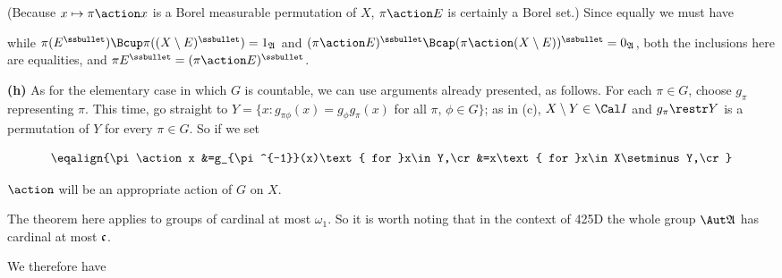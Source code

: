 {\noindent(Because $x\mapsto\pi\action x$ is a Borel measurable
permutation of $X$, $\pi\action E$ is certainly a Borel set.)
Since equally we must have


\noindent while
$\pi(E^{\ssbullet})\Bcup\pi((X\setminus E)^{\ssbullet})=1_{\frak A}$ and
$(\pi\action E)^{\ssbullet}
  \Bcap(\pi\action(X\setminus E))^{\ssbullet}=0_{\frak A}$,
both the inclusions here are equalities, and
$\pi E^{\ssbullet}=(\pi\action E)^{\ssbullet}$.\ \Qed

\medskip

{\bf (h)} As for the elementary case in which $G$ is countable, we can use
arguments already presented, as follows.   For each $\pi\in G$,
choose $g_{\pi}$ representing $\pi$.   This time, go
straight to
$Y=\{x:g_{\pi\phi}(x)=g_{\phi}g_{\pi}(x)$ for all $\pi$, $\phi\in G\}$;
as in (c), $X\setminus Y\in\Cal I$ and
$g_{\pi}\restr Y$ is a permutation of $Y$ for every $\pi\in G$.
So if we set

$$\eqalign{\pi\action x
&=g_{\pi^{-1}}(x)\text{ for }x\in Y,\cr
&=x\text{ for }x\in X\setminus Y,\cr}$$

\noindent $\action$ will be an appropriate action of $G$ on $X$.
}%

The theorem here applies to groups of cardinal at
most $\omega_1$.   So it is worth noting that in the context of 425D the
whole group $\Aut\frak A$ has cardinal at most $\frak c$.

We therefore have


